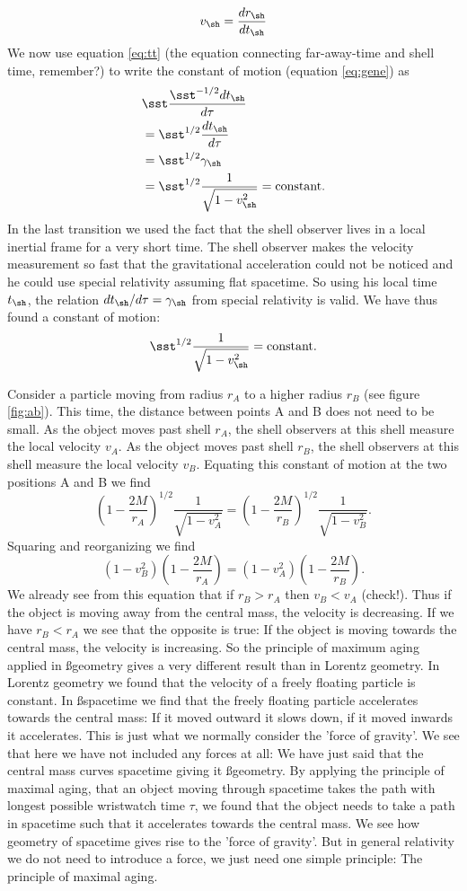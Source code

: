 {\begin{multicols}{2}
\[
v_\sh=\frac{dr_\sh}{dt_\sh}
\]
We now use equation \ref{eq:tt} (the equation connecting far-away-time and shell time, remember?) to write the constant of motion (equation \ref{eq:gene}) as
\begin{align*}
&\sst\frac{\sst^{-1/2}dt_\sh}{d\tau}\\
&=\sst^{1/2}\frac{dt_\sh}{d\tau}\\
&=\sst^{1/2}\gamma_\sh\\
&=\sst^{1/2}\frac{1}{\sqrt{1-v_\sh^2}}=\mathrm{constant}.
\end{align*}
In the last transition we used the fact that the shell observer lives in a local inertial frame for a very short time. The shell observer makes the velocity measurement so fast that the gravitational acceleration could not be noticed and he could use special relativity assuming flat spacetime. So using his local time $t_\sh$, the relation $dt_\sh/d\tau=\gamma_\sh$ from special relativity is valid. We have thus found a constant of motion:
\[
\sst^{1/2}\frac{1}{\sqrt{1-v_\sh^2}}=\mathrm{constant}.
\]

Consider a particle moving from radius $r_A$ to a higher radius $r_B$ (see figure \ref{fig:ab}). This time, the distance between points A and B does not need to be small. As the object moves past shell $r_A$, the shell observers at this shell measure the local velocity $v_A$. As the object moves past shell $r_B$, the shell observers at this shell measure the local velocity $v_B$. Equating this constant of motion at the two positions A and B we find
\[
\left(1-\frac{2M}{r_A}\right)^{1/2}\frac{1}{\sqrt{1-v_A^2}}=\left(1-\frac{2M}{r_B}\right)^{1/2}\frac{1}{\sqrt{1-v_B^2}}.
\]
Squaring and reorganizing we find
\[
(1-v_B^2)\left(1-\frac{2M}{r_A}\right)=(1-v_A^2)\left(1-\frac{2M}{r_B}\right).
\]
We already see from this equation that if $r_B>r_A$ then $v_B<v_A$ (check!). Thus if the object is moving away from the central mass, the velocity is decreasing. If we have $r_B<r_A$ we see that the opposite is true: If the object is moving towards the central mass, the velocity is increasing. So the principle of maximum aging applied in \ss geometry gives a very different result than in Lorentz geometry. In Lorentz geometry we found that the velocity of a freely floating particle is constant. In \ss spacetime we find that the freely floating particle accelerates towards the central mass: If it moved outward it slows down, if it moved inwards it accelerates. This is just what we normally consider the 'force of gravity'. We see that here we have not included any forces at all: We have just said that the central mass curves spacetime giving it \ss geometry. By applying the principle of maximal aging, that an object moving through spacetime takes the path with longest possible wristwatch time $\tau$, we found that the object needs to take a path in spacetime such that it accelerates towards the central mass. We see how geometry of spacetime gives rise to the 'force of gravity'. But in general relativity we do not need to introduce a force, we just need one simple principle: The principle of maximal aging.


\end{multicols}}
